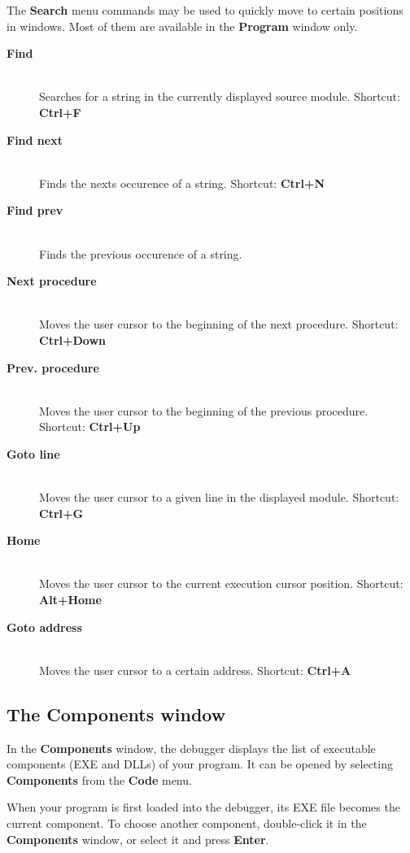 The {\bf Search} menu commands may be used to quickly move to certain
positions in windows. Most of them are available in the {\bf Program}
window only.

\begin{description}
\item[{\bf Find}] \mbox{} \\
  Searches for a string in the currently displayed source module.
  Shortcut: {\bf Ctrl+F}
\item[{\bf Find next}] \mbox{} \\
  Finds the nexts occurence of a string.
  Shortcut: {\bf Ctrl+N}
\item[{\bf Find prev}] \mbox{} \\
  Finds the previous occurence of a string.
\item[{\bf Next procedure}] \mbox{} \\
  Moves the user cursor to the beginning of the next procedure.
  Shortcut: {\bf Ctrl+Down}
\item[{\bf Prev. procedure}] \mbox{} \\
  Moves the user cursor to the beginning of the previous procedure.
  Shortcut: {\bf Ctrl+Up}
\item[{\bf Goto line}] \mbox{} \\
  Moves the user cursor to a given line in the displayed module.
  Shortcut: {\bf Ctrl+G}
\item[{\bf Home}] \mbox{} \\
  Moves the user cursor to the current execution cursor position.
  Shortcut: {\bf Alt+Home}
\item[{\bf Goto address}] \mbox{} \\
  Moves the user cursor to a certain address.
  Shortcut: {\bf Ctrl+A}
\end{description}

\subsection{The Components window}
\label{dialog:navigating:components}

In the {\bf Components} window, the debugger displays the list
of executable components (EXE and DLLs) of your program.
It can be opened by selecting {\bf Components} from the
{\bf Code} menu.

When your program is first loaded into the debugger, its EXE file
becomes the current component. To choose another component,
double-click it in the {\bf Components} window, or select it and
press {\bf Enter}.

